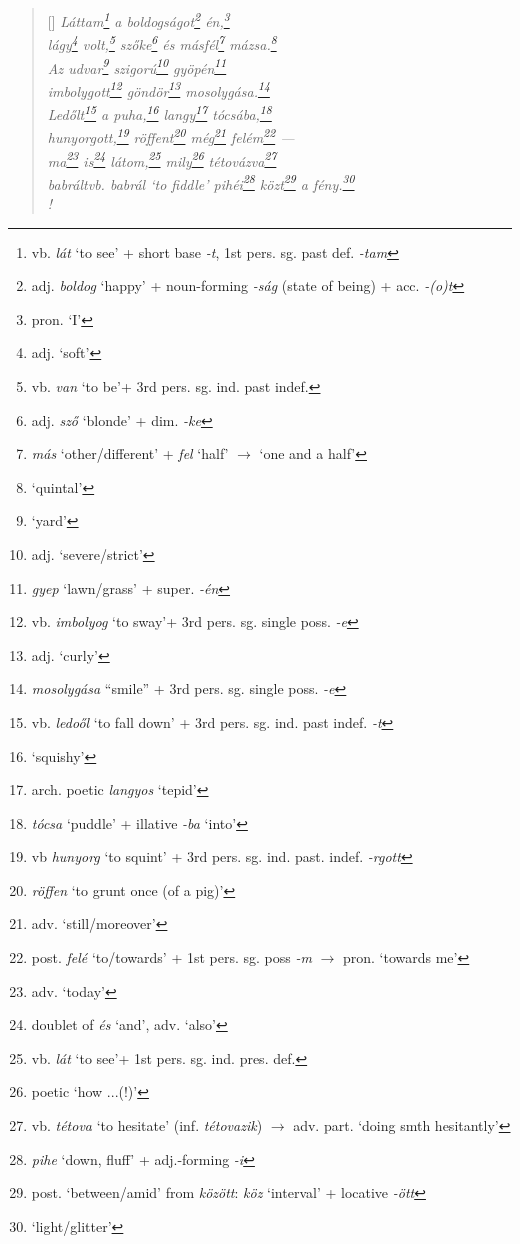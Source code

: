 \documentclass[a4paper,12pt,twoside,final]{book}
\begin{document}
\begin{verse}[\versewidth]
  \it
  Láttam\footnote{vb. \emph{lát} `to see' +
  short base \emph{-t}, 1st pers. sg. past def. \emph{-tam}} a
  boldogságot\footnote{adj. \emph{boldog} `happy' + noun-forming
  \emph{-ság} (state of being) + acc. \emph{-(o)t}}
  én,\footnote{pron. `I'} \\
  lágy\footnote{adj. `soft'} volt,\footnote{vb. \emph{van} `to
  be'+ 3rd pers. sg. ind. past indef.} szőke\footnote{adj. \emph{sző}
  `blonde' + dim. \emph{-ke}} és másfél\footnote{\emph{más}
  `other/different' + \emph{fel} `half' $\rightarrow$ `one and a
  half'} mázsa.\footnote{`quintal'} \\
  Az udvar\footnote{`yard'} szigorú\footnote{adj. `severe/strict'}
  gyöpén\footnote{\emph{gyep} `lawn/grass' + super. \emph{-én}}  \\
  imbolygott\footnote{vb. \emph{imbolyog} `to sway'+ 3rd
  pers. sg. single poss. \emph{-e}} göndör\footnote{adj. `curly'}
  mosolygása.\footnote{\emph{mosolygása} ``smile'' + 3rd
  pers. sg. single poss. \emph{-e}} \\
  Ledőlt\footnote{vb. \emph{ledoől} `to fall down' + 3rd
  pers. sg. ind. past indef. \emph{-t}} a puha,\footnote{`squishy'}
  langy\footnote{arch. poetic \emph{langyos} `tepid'}
  tócsába,\footnote{\emph{tócsa} `puddle' + illative \emph{-ba}
  `into'} \\
  hunyorgott,\footnote{vb \emph{hunyorg} `to squint' + 3rd
  pers. sg. ind. past. indef. \emph{-rgott}}
  röffent\footnote{\emph{röffen} `to grunt once (of a pig)'}
  még\footnote{adv. `still/moreover'} felém\footnote{post. \emph{felé}
  `to/towards' + 1st pers. sg. poss \emph{-m} $\rightarrow$
  pron. `towards me'} --- \\
  ma\footnote{adv. `today'} is\footnote{doublet of \emph{és} `and',
  adv. `also'} látom,\footnote{vb. \emph{lát} `to see'+ 1st
  pers. sg. ind. pres. def.} mily\footnote{poetic `how ...(!)'}
  tétovázva\footnote{vb. \emph{tétova} `to hesitate'
  (inf. \emph{tétovazik}) $\rightarrow$ adv. part. `doing smth
  hesitantly'} \\
  babrált\emph{vb. \emph{babrál} `to fiddle'}
  pihéi\footnote{\emph{pihe} `down, fluff' + adj.-forming \emph{-i}}
  közt\footnote{post. `between/amid' from \emph{között}: \emph{köz}
  `interval' + locative \emph{-ött}} a fény.\footnote{`light/glitter'} \\!
\end{verse}
\end{document}
